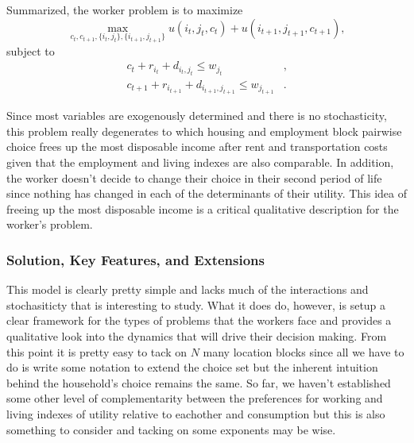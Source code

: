\documentclass[11pt,english]{article}
\begin{document}
\noindent Summarized, the worker problem is to maximize $$\max_{c_t, c_{t+1}, \{i_t, j_t\}, \{i_{t+1}, j_{t+1}\}} u\left(i_t,j_t, c_t\right) + u\left(i_{t+1},j_{t+1}, c_{t+1}\right),$$
subject to \begin{align*}
c_t + r_{i_t} + d_{i_t,j_t}\leq w_{j_t}&,\\
c_{t+1} + r_{i_{t+1}} + d_{i_{t+1}, j_{t+1}}\leq w_{j_{t+1}}&.
\end{align*}

\noindent Since most variables are exogenously determined and there is no stochasticity, this problem really degenerates to which housing and employment block pairwise choice frees up the most disposable income after rent and transportation costs given that the employment and living indexes are also comparable. In addition, the worker doesn't decide to change their choice in their second period of life since nothing has changed in each of the determinants of their utility. This idea of freeing up the most disposable income is a critical qualitative description for the worker's problem.

\subsubsection{Solution, Key Features, and Extensions}

This model is clearly pretty simple and lacks much of the interactions and stochasiticty that is interesting to study. What it does do, however, is setup a clear framework for the types of problems that the workers face and provides a qualitative look into the dynamics that will drive their decision making. From this point it is pretty easy to tack on $N$ many location blocks since all we have to do is write some notation to extend the choice set but the inherent intuition behind the household's choice remains the same. So far, we haven't established some other level of complementarity between the preferences for working and living indexes of utility relative to eachother and consumption but this is also something to consider and tacking on some exponents may be wise. \\
\end{document}
